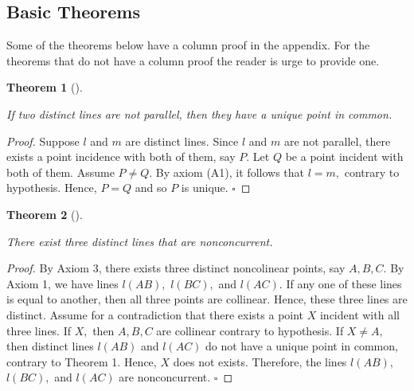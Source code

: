 \documentclass[
  twoside,
  12pt,
  letterpaper,
  fleqn]{article}
\theoremstyle{definition}
\theoremstyle{definition}
\theoremstyle{plain}
\theoremstyle{plain}
\newtheorem{theorem}{Theorem}[section]
\theoremstyle{remark}
\begin{document}
\hypertarget{basic-theorems}{%
\subsection{Basic Theorems}\label{basic-theorems}}

Some of the theorems below have a column proof in the appendix. For the
theorems that do not have a column proof the reader is urge to provide
one.

\begin{theorem}[]\protect\hypertarget{thm-one}{}\label{thm-one}

If two distinct lines are not parallel, then they have a unique point in
common.

\end{theorem}

\begin{proof}

Suppose \(l\) and \(m\) are distinct lines. Since \(l\) and \(m\) are
not parallel, there exists a point incidence with both of them, say
\(P.\) Let \(Q\) be a point incident with both of them. Assume
\(P\neq Q.\) By axiom (A1), it follows that \(l=m,\) contrary to
hypothesis. Hence, \(P=Q\) and so \(P\) is unique. \(\square\)

\end{proof}

\begin{theorem}[]\protect\hypertarget{thm-two}{}\label{thm-two}

There exist three distinct lines that are nonconcurrent.

\end{theorem}

\begin{proof}

By Axiom 3, there exists three distinct noncolinear points, say
\(A, B, C.\) By Axiom 1, we have lines \(l(AB),\) \(l(BC),\) and
\(l(AC).\) If any one of these lines is equal to another, then all three
points are collinear. Hence, these three lines are distinct. Assume for
a contradiction that there exists a point \(X\) incident with all three
lines. If \(X,\) then \(A, B, C\) are collinear contrary to hypothesis.
If \(X\neq A,\) then distinct lines \(l(AB)\) and \(l(AC)\) do not have
a unique point in common, contrary to Theorem 1. Hence, \(X\) does not
exists. Therefore, the lines \(l(AB),\) \(l(BC),\) and \(l(AC)\) are
nonconcurrent. \(\square\)

\end{proof}
\end{document}
